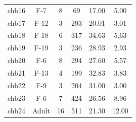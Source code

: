 \begin{table}[ht]
{\begin{tabular}{cccccc}
        chb16   & F-7        & 8        & 69                                                                     & 17.00                                                          & 5.00                                                                                  \\
        chb17   & F-12       & 3        & 293                                                                    & 20.01                                                          & 3.01                                                                                  \\
        chb18   & F-18       & 6        & 317                                                                    & 34.63                                                          & 5.63                                                                                  \\
        chb19   & F-19       & 3        & 236                                                                    & 28.93                                                          & 2.93                                                                                  \\
        chb20   & F-6        & 8        & 294                                                                    & 27.60                                                          & 5.57                                                                                  \\
        chb21   & F-13       & 4        & 199                                                                    & 32.83                                                          & 3.83                                                                                  \\
        chb22   & F-9        & 3        & 204                                                                    & 31.00                                                          & 3.00                                                                                  \\
        chb23   & F-6        & 7        & 424                                                                    & 26.56                                                          & 8.96                                                                                  \\
        chb24   & Adult      & 16       & 511                                                                    & 21.30                                                          & 12.00                                                                                 \\ \hline

\end{tabular}}
\end{table}
